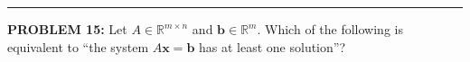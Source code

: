 \documentclass[12pt]{amsart}
\newcommand{\divider}{
  \vspace{-1em} %
  \noindent
  \raisebox{-0.15ex}{\textbullet}%
  \hspace{0.5em}%
  \rule[0.5ex]{0.95\textwidth}{1.0pt}%
  \hspace{0.5em}%
  \raisebox{-0.15ex}{\textbullet}%
  \vspace{0em} %
}
\begin{document}
%
%
%

\divider

{\bf PROBLEM 15:}
%
Let $A \in \mathbb{R}^{m \times n}$ and $\mathbf{b} \in \mathbb{R}^m$. Which
of the following is equivalent to ``the system $A\mathbf{x} = \mathbf{b}$
has at least one solution''?
\end{document}
